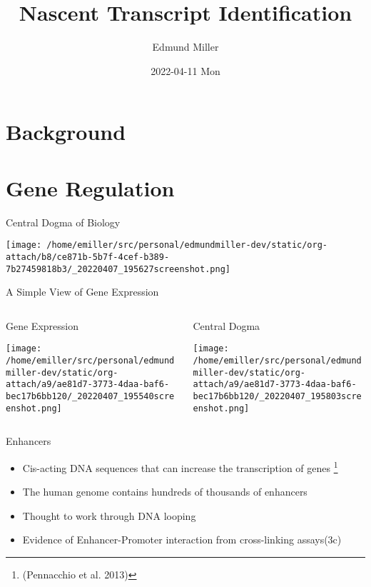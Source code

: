 \documentclass[bigger]{beamer}
\author{Edmund Miller}
\date{2022-04-11 Mon}
\title{Nascent Transcript Identification}
\begin{document}
\maketitle

\section*{Background}
\label{sec:org4d64b2c}
\section*{Gene Regulation}
\label{sec:org0a86e02}
\begin{frame}[label={sec:orgd44b062}]{Central Dogma of Biology}
\begin{center}
\texttt{[image: /home/emiller/src/personal/edmundmiller-dev/static/org-attach/b8/ce871b-5b7f-4cef-b389-7b27459818b3/\_20220407\_195627screenshot.png]}
\end{center}
\end{frame}

\begin{frame}[label={sec:orgcc08c87}]{A Simple View of Gene Expression}
\begin{columns}
\begin{column}{0.45\columnwidth}
\begin{block}{Gene Expression}
\begin{center}
\texttt{[image: /home/emiller/src/personal/edmundmiller-dev/static/org-attach/a9/ae81d7-3773-4daa-baf6-bec17b6bb120/\_20220407\_195540screenshot.png]}
\end{center}
\end{block}
\end{column}


\begin{column}{0.45\columnwidth}
\begin{block}{Central Dogma}
\begin{center}
\texttt{[image: /home/emiller/src/personal/edmundmiller-dev/static/org-attach/a9/ae81d7-3773-4daa-baf6-bec17b6bb120/\_20220407\_195803screenshot.png]}
\end{center}
\end{block}
\end{column}
\end{columns}
\end{frame}


\begin{frame}[label={sec:orgd6a45f1}]{Enhancers}
\begin{itemize}
\item Cis-acting DNA sequences that can increase the transcription of genes \footnote{(Pennacchio et al. 2013)\label{orge454700}}
\item The human genome contains hundreds of thousands of enhancers
\item Thought to work through DNA looping
\item Evidence of Enhancer-Promoter interaction from cross-linking assays(3c)
\end{itemize}
\end{frame}
\end{document}
